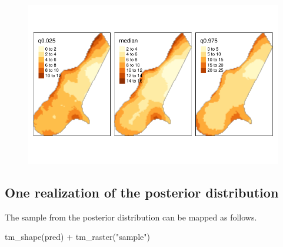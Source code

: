 \documentclass[
  a4paper,
]{article}
\newenvironment{Shaded}{\begin{snugshade}}{\end{snugshade}}
\newcommand{\CommentTok}[1]{\textcolor[rgb]{0.37,0.37,0.37}{#1}}
\newcommand{\DecValTok}[1]{\textcolor[rgb]{0.68,0.00,0.00}{#1}}
\newcommand{\FloatTok}[1]{\textcolor[rgb]{0.68,0.00,0.00}{#1}}
\newcommand{\FunctionTok}[1]{\textcolor[rgb]{0.28,0.35,0.67}{#1}}
\newcommand{\NormalTok}[1]{\textcolor[rgb]{0.00,0.23,0.31}{#1}}
\newcommand{\OtherTok}[1]{\textcolor[rgb]{0.00,0.23,0.31}{#1}}
\newcommand{\SpecialCharTok}[1]{\textcolor[rgb]{0.37,0.37,0.37}{#1}}
\newcommand{\StringTok}[1]{\textcolor[rgb]{0.13,0.47,0.30}{#1}}
\begin{document}
\begin{Shaded}
\end{Shaded}

\begin{figure}[H]

{\centering \includegraphics{pedometron_files/figure-pdf/unnamed-chunk-13-1.pdf}

}

\end{figure}

\hypertarget{one-realization-of-the-posterior-distribution}{%
\subsection{One realization of the posterior
distribution}\label{one-realization-of-the-posterior-distribution}}

The sample from the posterior distribution can be mapped as follows.

\begin{Shaded}
\begin{Highlighting}[]
\FunctionTok{tm\_shape}\NormalTok{(pred) }\SpecialCharTok{+} \FunctionTok{tm\_raster}\NormalTok{(}\StringTok{"sample"}\NormalTok{)}
\end{Highlighting}
\end{Shaded}
\end{document}
